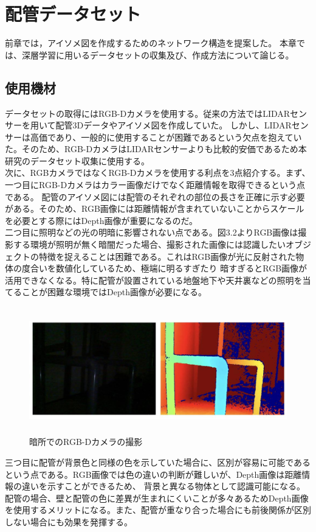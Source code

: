 \chapter{%
配管データセット}

前章では，アイソメ図を作成するためのネットワーク構造を提案した。
本章では、深層学習に用いるデータセットの収集及び、作成方法について論じる。


\section{使用機材}
データセットの取得にはRGB-Dカメラを使用する。従来の方法ではLIDARセンサーを用いて配管3Dデータやアイソメ図を作成していた。
しかし、LIDARセンサーは高価であり、一般的に使用することが困難であるという欠点を抱えていた。そのため、RGB-DカメラはLIDARセンサーよりも比較的安価であるため本研究のデータセット収集に使用する。\\
次に、RGBカメラではなくRGB-Dカメラを使用する利点を3点紹介する。まず、一つ目にRGB-Dカメラはカラー画像だけでなく距離情報を取得できるという点である。
配管のアイソメ図には配管のそれぞれの部位の長さを正確に示す必要がある。そのため、RGB画像には距離情報が含まれていないことからスケールを必要とする際にはDepth画像が重要になるのだ。\\
二つ目に照明などの光の明暗に影響されない点である。図3.2よりRGB画像は撮影する環境が照明が無く暗闇だった場合、撮影された画像には認識したいオブジェクトの特徴を捉えることは困難である。これはRGB画像が光に反射された物体の度合いを数値化しているため、極端に明るすぎたり
暗すぎるとRGB画像が活用できなくなる。特に配管が設置されている地盤地下や天井裏などの照明を当てることが困難な環境ではDepth画像が必要になる。\\
\begin{figure}[htbt]
    \centering
     \includegraphics[height=55mm]{pipe_rgbd.eps}
     \caption{暗所でのRGB-Dカメラの撮影}
     \label{fig:f2}
\end{figure}

三つ目に配管が背景色と同様の色を示していた場合に、区別が容易に可能であるという点である。RGB画像では色の違いの判断が難しいが、Depth画像は距離情報の違いを示すことができるため、
背景と異なる物体として認識可能になる。配管の場合、壁と配管の色に差異が生まれにくいことが多々あるためDepth画像を使用するメリットになる。また、配管が重なり合った場合にも前後関係が区別しない場合にも効果を発揮する。\\


